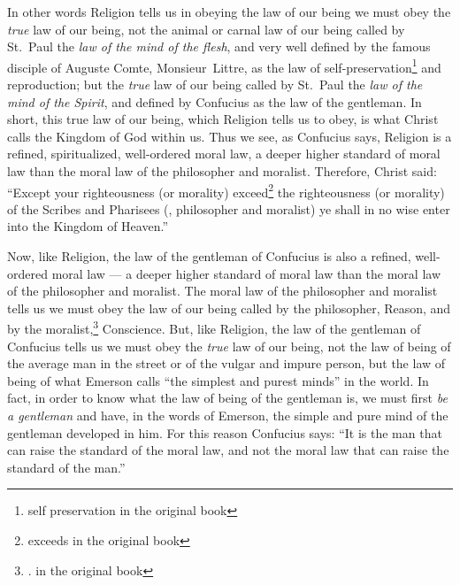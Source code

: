 In other words Religion tells us in obeying the law of our being we must obey the \emph{true} law of our being, not the animal or carnal law of our being called by St.~Paul  the \emph{law of the mind of the flesh}, and very well defined by the famous disciple of Auguste Comte,  Monsieur~Littre,  as the law of self-preservation\footnote{self preservation in the original book} and reproduction; but the \emph{true} law of our being called by St.~Paul the \emph{law of the mind of the Spirit}, and defined by Confucius as the law of the gentleman.
In short, this true law of our being, which Religion tells us to obey, is what Christ calls the Kingdom of God within us.
Thus we see, as Confucius says, Religion is a refined, spiritualized, well-ordered moral law, a deeper higher standard of moral law than the moral law of the philosopher and moralist.
Therefore, Christ said: ``Except your righteousness (or morality) exceed\footnote{exceeds in the original book} the righteousness (or morality) of the Scribes and Pharisees  (\ie, philosopher and moralist) ye shall in no wise enter into the Kingdom of Heaven.''

Now, like Religion, the law of the gentleman of Confucius is also a refined, well-ordered moral law --- a deeper higher standard of moral law than the moral law of the philosopher and moralist.
The moral law of the philosopher and moralist tells us we must obey the law of our being called by the philosopher, Reason, and by the moralist,\footnote{. in the original book} Conscience.
But, like Religion, the law of the gentleman of Confucius tells us we must obey the \emph{true} law of our being, not the law of being of the average man in the street or of the vulgar and impure person, but the law of being of what Emerson  calls ``the simplest and purest minds'' in the world.
In fact, in order to know what the law of being of the gentleman is, we must first \emph{be a gentleman} and have, in the words of Emerson, the simple and pure mind of the gentleman developed in him.
For this reason Confucius says: ``It is the man that can raise the standard of the moral law, and not the moral law that can raise the standard of the man.''\cite{num21}


